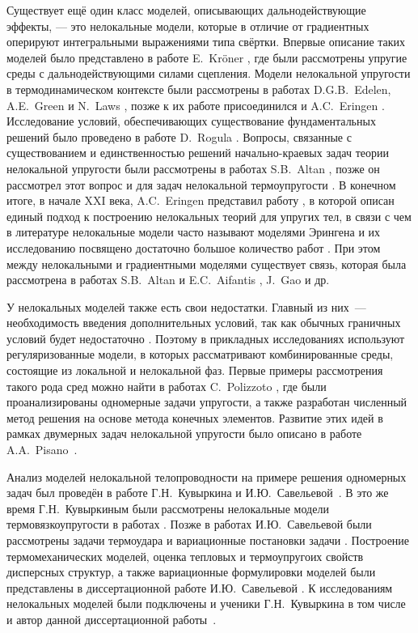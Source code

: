 \ifsynopsis
\else
Существует ещё один класс моделей, описывающих дальнодействующие эффекты, --- это нелокальные модели, которые в отличие от градиентных оперируют интегральными выражениями типа свёртки. Впервые описание таких моделей было представлено в работе E.~Kr{\"o}ner \cite{Kroner}, где были рассмотрены упругие среды с дальнодействующими силами сцепления. Модели нелокальной упругости в термодинамическом контексте были рассмотрены в работах D.G.B.~Edelen, A.E.~Green и N.~Laws \cite{Edelen1, Edelen2}, позже к их работе присоединился и A.C.~Eringen \cite{Eringen5, Eringen6}. Исследование условий, обеспечивающих существование фундаментальных решений было проведено в работе D.~Rogula \cite{Rogula1982}. Вопросы, связанные с существованием и единственностью решений начально-краевых задач теории нелокальной упругости были рассмотрены в работах S.B.~Altan \mbox{\cite{Altan1, Altan2},} позже он рассмотрел этот вопрос и для задач нелокальной термоупругости \mbox{\cite{Altan3, Altan4}.} В конечном итоге, в начале XXI века, A.C.~Eringen представил работу \cite{Eringen1}, в которой описан единый подход к построению нелокальных теорий для упругих тел, в связи с чем в литературе нелокальные модели часто называют моделями Эрингена и их исследованию посвящено достаточно большое количество работ \cite{BondaryLayer, Tuna, Rahmani}. При этом между нелокальными и градиентными моделями существует связь, которая была рассмотрена в работах S.B.~Altan и E.C.~Aifantis \cite{Aifantis3}, J.~Gao \cite{Gao} и др.
\fi

\ifsynopsis
\else
У нелокальных моделей также есть свои недостатки. Главный из них~--- необходимость введения дополнительных условий, так как обычных граничных условий будет недостаточно \cite{Pisano2}. Поэтому в прикладных исследованиях используют регуляризованные модели, в которых рассматривают комбинированные среды, состоящие из локальной и нелокальной фаз. Первые примеры рассмотрения такого рода сред можно найти в работах C.~Polizzoto \cite{Polizzotto1, Polizzotto2}, где были проанализированы одномерные задачи упругости, а также разработан численный метод решения на основе метода конечных элементов. Развитие этих идей в рамках двумерных задач нелокальной упругости было описано в работе A.A.~Pisano~\cite{Pisano1}.
\fi

\ifsynopsis
\else
Анализ моделей нелокальной телопроводности на примере решения одномерных задач был проведён в работе Г.Н.~Кувыркина и И.Ю.~Савельевой~\cite{NonlocalThermal1}. В это же время Г.Н.~Кувыркиным были рассмотрены нелокальные модели термовязкоупругости в работах \cite{ThermoViscoElasticity1, ThermoViscoElasticity2, ThermoViscoElasticity3}. Позже в работах И.Ю.~Савельевой были рассмотрены задачи термоудара \cite{ThermoUdar1, ThermoUdar2} и вариационные постановки задачи \mbox{\cite{NonlocalThermalVariation1, NonlocalThermalVariation2}}. Построение термомеханических моделей, оценка тепловых и термоупругоих свойств дисперсных структур, а также вариационные формулировки моделей были представлены в диссертационной работе И.Ю.~Савельевой \cite{SavelievaDisser}. К исследованиям нелокальных моделей были подключены и ученики Г.Н.~Кувыркина в том числе и автор данной диссертационной работы~\mbox{\cite{AMCSM2019, ZAMM, NonlocalSaintVenant, NonlocalRadiation, KirshProblem}.}
\fi

